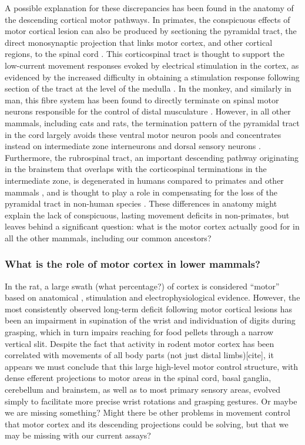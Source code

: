 A possible explanation for these discrepancies has been found in the anatomy of the descending cortical motor pathways. In primates, the conspicuous effects of motor cortical lesion can also be produced by sectioning the pyramidal tract, the direct monosynaptic projection that links motor cortex, and other cortical regions, to the spinal cord \cite{Tower1940,Lawrence1968}. This corticospinal tract is thought to support the low-current movement responses evoked by electrical stimulation in the cortex, as evidenced by the increased difficulty in obtaining a stimulation response following section of the tract at the level of the medulla \cite{Woolsey1972}. In the monkey, and similarly in man, this fibre system has been found to directly terminate on spinal motor neurons responsible for the control of distal musculature \cite{Leyton1917,Bernhard1954}. However, in all other mammals, including cats and rats, the termination pattern of the pyramidal tract in the cord largely avoids these ventral motor neuron pools and concentrates instead on intermediate zone interneurons and dorsal sensory neurons \cite{Kuypers1981,Yang2003}. Furthermore, the rubrospinal tract, an important descending pathway originating in the brainstem that overlaps with the corticospinal terminations in the intermediate zone, is degenerated in humans compared to primates and other mammals \cite{Square1982}, and is thought to play a role in compensating for the loss of the pyramidal tract in non-human species \cite{Lawrence1968a,Zaaimi2012}. These differences in anatomy might explain the lack of conspicuous, lasting movement deficits in non-primates, but leaves behind a significant question: what is the motor cortex actually good for in all the other mammals, including our common ancestors?

\subsubsection*{What is the role of motor cortex in lower mammals?}

In the rat, a large swath (what percentage?) of cortex is considered ``motor'' based on anatomical \cite{Donoghue1982}, stimulation \cite{Donoghue1982,Neafsey1986} and electrophysiological evidence. However, the most consistently observed long-term deficit following motor cortical lesions has been an impairment in supination of the wrist and individuation of digits during grasping, which in turn impairs reaching for food pellets through a narrow vertical slit. Despite the fact that activity in rodent motor cortex has been correlated with movements of all body parts (not just distal limbs)[cite], it appears we must conclude that this large high-level motor control structure, with dense efferent projections to motor areas in the spinal cord, basal ganglia, cerebellum and brainstem, as well as to most primary sensory areas, evolved simply to facilitate more precise wrist rotations and grasping gestures. Or maybe we are missing something? Might there be other problems in movement control that motor cortex and its descending projections could be solving, but that we may be missing with our current assays?

